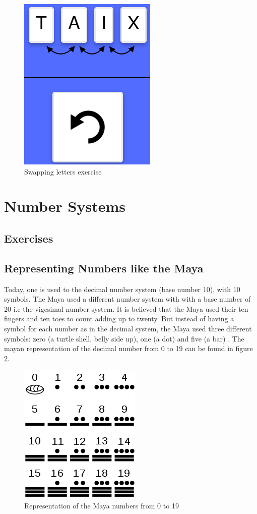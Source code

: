 \begin{figure} 
  \centering
  \includegraphics[width=0.2 \columnwidth]{figures/words_swap.png}
  \caption{Swapping letters exercise} 
  \label{fig:swappingLetters} 
\end{figure}

\section{Number Systems}
\label{section:numberSystems}

\subsection{Exercises}
\subsection*{Representing Numbers like the Maya}

Today, one is used to the decimal number system (base number 10), with 10 symbols. The Maya used a different number system with with a base number of 20 i.e the vigesimal number system. It is believed that the Maya used their ten fingers and ten toes to count adding up to twenty. But instead of having a symbol for each number as in the decimal system, the Maya used three different symbols: zero (a turtle shell, belly side up), one (a dot) and five (a bar) \cite{Maya}. The mayan representation of the decimal number from 0 to 19 can be found in figure \ref{fig:maya_numerals}.

\begin{figure} 
    \centering
    \includegraphics[width=0.3 \columnwidth]{figures/maya_number_system.png}
    \caption{Representation of the Maya numbers from 0 to 19} 
    \label{fig:maya_numerals} 
\end{figure}


